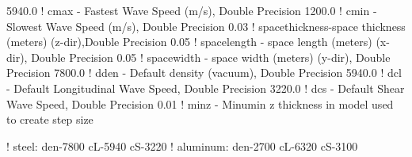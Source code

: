 5940.0  ! cmax - Fastest Wave Speed (m/s), Double Precision
1200.0  ! cmin - Slowest Wave Speed (m/s), Double Precision
0.03    ! spacethickness-space thickness (meters) (z-dir),Double Precision
0.05	! spacelength - space length (meters) (x-dir), Double Precision
0.05    ! spacewidth - space width (meters) (y-dir), Double Precision
7800.0  ! dden - Default density (vacuum), Double Precision
5940.0  ! dcl - Default Longitudinal Wave Speed, Double Precision
3220.0  ! dcs - Default Shear Wave Speed, Double Precision
0.01    ! minz - Minumin z thickness in model used to create step size




!  steel: den-7800 cL-5940 cS-3220
!  aluminum: den-2700 cL-6320 cS-3100
